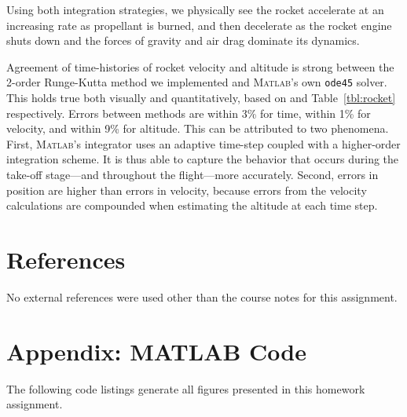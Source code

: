 \documentclass[12pt]{article}
\begin{document}
Using both integration strategies, we physically see the rocket accelerate at an increasing rate as propellant is burned, and then decelerate as the rocket engine shuts down and the forces of gravity and air drag dominate its dynamics. 

Agreement of time-histories of rocket velocity and altitude is strong between the 2\nd-order Runge-Kutta method we implemented and \textsc{Matlab}'s own \lstinline|ode45| solver. This holds true both visually and quantitatively, based on  and Table~\ref{tbl:rocket} respectively. Errors between methods are within 3\% for time, within 1\% for velocity, and within 9\% for altitude. This can be attributed to two phenomena. First, \textsc{Matlab}'s integrator uses an adaptive time-step coupled with a higher-order integration scheme. It is thus able to capture the behavior that occurs during the take-off stage---and throughout the flight---more accurately. Second, errors in position are higher than errors in velocity, because errors from the velocity calculations are compounded when estimating the altitude at each time step.

\section{References}

No external references were used other than the course notes for this assignment.

\section*{Appendix: MATLAB Code}
The following code listings generate all figures presented in this homework assignment.




\end{document}
